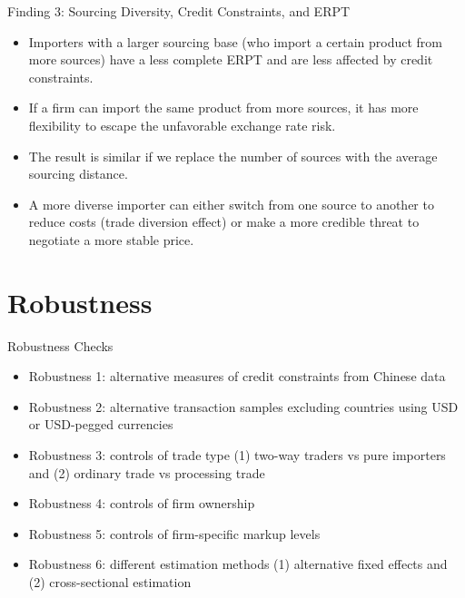 \documentclass[10pt]{beamer}
\begin{document}
\begin{frame}{Finding 3: Sourcing Diversity, Credit Constraints, and ERPT}
    \begin{tcolorbox}[colback=blue!5!white, colframe=blue!75!black,title=Finding 3]
	\begin{itemize}
		\item Importers with a larger sourcing base (who import a certain product from more sources) have a less complete ERPT and are less affected by credit constraints.
	\end{itemize}
    \end{tcolorbox}
    \begin{itemize}
	\item If a firm can import the same product from more sources, it has more flexibility to escape the unfavorable exchange rate risk.
        \item The result is similar if we replace the number of sources with the average sourcing distance.
	\item A more diverse importer can either switch from one source to another to reduce costs (trade diversion effect) or make a more credible threat to negotiate a more stable price.
    \end{itemize}
\end{frame}

\section{Robustness}

\begin{frame}[label=robustness_other]{Robustness Checks}
    \begin{itemize}
        \item Robustness 1: alternative measures of credit constraints from Chinese data
        \vfill
        \item Robustness 2: alternative transaction samples excluding countries using USD or USD-pegged currencies
        \vfill
	\item Robustness 3: controls of trade type (1) two-way traders vs pure importers and (2) ordinary trade vs processing trade \hyperlink{tab.robust.tradetype}{}
        \vfill
        \item Robustness 4: controls of firm ownership \hyperlink{tab.robust.ownership}{}
        \vfill
        \item Robustness 5: controls of firm-specific markup levels \hyperlink{tab.markup}{}
        \vfill
        \item Robustness 6: different estimation methods (1) alternative fixed effects \hyperlink{tab.robust.fe}{} and (2) cross-sectional estimation \hyperlink{tab.robust.crosec}{}
    \end{itemize}
\end{frame}
\end{document}
